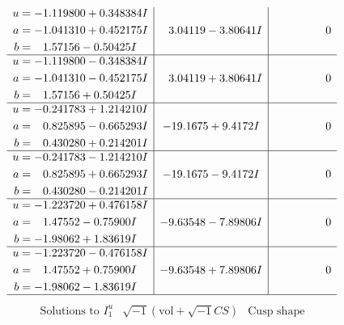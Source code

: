 \documentclass[1p]{elsarticle_modified}
\theoremstyle{definition}
\newcommand{\I}{\sqrt{-1}}
\begin{document}
$$\begin{array}{c|c|c}
\begin{aligned}
u &= -1.119800 + 0.348384 I \\
a &= -1.041310 + 0.452175 I \\
b &= \phantom{-}1.57156 - 0.50425 I\end{aligned}
 & \phantom{-}3.04119 - 3.80641 I & \phantom{-0.000000 } 0 \\ \hline\begin{aligned}
u &= -1.119800 - 0.348384 I \\
a &= -1.041310 - 0.452175 I \\
b &= \phantom{-}1.57156 + 0.50425 I\end{aligned}
 & \phantom{-}3.04119 + 3.80641 I & \phantom{-0.000000 } 0 \\ \hline\begin{aligned}
u &= -0.241783 + 1.214210 I \\
a &= \phantom{-}0.825895 - 0.665293 I \\
b &= \phantom{-}0.430280 + 0.214201 I\end{aligned}
 & -19.1675 + 9.4172 I & \phantom{-0.000000 } 0 \\ \hline\begin{aligned}
u &= -0.241783 - 1.214210 I \\
a &= \phantom{-}0.825895 + 0.665293 I \\
b &= \phantom{-}0.430280 - 0.214201 I\end{aligned}
 & -19.1675 - 9.4172 I & \phantom{-0.000000 } 0 \\ \hline\begin{aligned}
u &= -1.223720 + 0.476158 I \\
a &= \phantom{-}1.47552 - 0.75900 I \\
b &= -1.98062 + 1.83619 I\end{aligned}
 & -9.63548 - 7.89806 I & \phantom{-0.000000 } 0 \\ \hline\begin{aligned}
u &= -1.223720 - 0.476158 I \\
a &= \phantom{-}1.47552 + 0.75900 I \\
b &= -1.98062 - 1.83619 I\end{aligned}
 & -9.63548 + 7.89806 I & \phantom{-0.000000 } 0\\
 \hline 
 \end{array}$$\newpage$$\begin{array}{c|c|c}  
\text{Solutions to }I^u_{1}& \I (\text{vol} + \sqrt{-1}CS) & \text{Cusp shape}\\
 \hline 
\begin{aligned}

\end{aligned}
\end{array}$$
\end{document}
